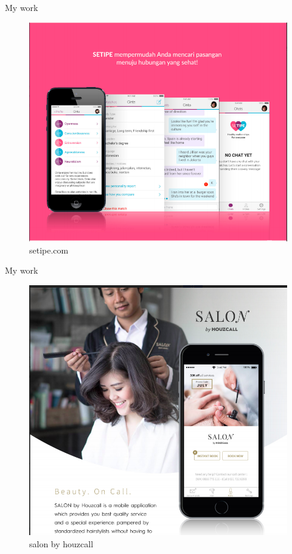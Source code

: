 \documentclass{beamer}
\begin{document}
    \begin{frame}{My work}
	\begin{center}
		\begin{figure}
		\includegraphics[scale=0.3]{images/setipe.png}
		\caption{setipe.com}
		\end{figure}
	\end{center}
  \end{frame}
    \begin{frame}{My work}
	\begin{center}
		\begin{figure}
		\includegraphics[scale=0.25]{images/salon.png}
		\caption{salon by houzcall}
		\end{figure}
	\end{center}
  \end{frame}
\end{document}
